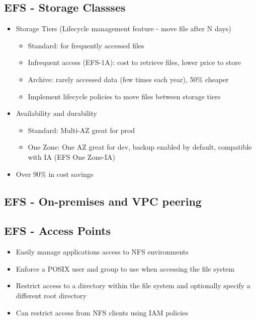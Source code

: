 \subsection{EFS - Storage Classses}
\begin{itemize}
    \item Storage Tiers (Lifecycle management feature - move file after N days)
    \begin{itemize}
        \item Standard: for frequently accessed files
        \item Infrequent access (EFS-1A): cost to retrieve files, lower price to store
        \item Archive: rarely accessed data (few times each year), 50\% cheaper
        \item Implement lifecycle policies to move files between storage tiers
    \end{itemize}
    \item Availability and durability
    \begin{itemize}
        \item Standard: Multi-AZ great for prod
        \item One Zone: One AZ great for dev, backup enabled by default, compatible with IA (EFS One Zone-IA)
    \end{itemize}
    \item Over 90\% in cost savings
\end{itemize}

\subsection{EFS - On-premises and VPC peering}

\subsection{EFS - Access Points}
\begin{itemize}
    \item Easily manage applications access to NFS environments
    \item Enforce a POSIX user and group to use when accessing the file system
    \item Restrict access to a directory within the file system and optionally specify a different root directory
    \item Can restrict access from NFS clients using IAM policies
\end{itemize}

